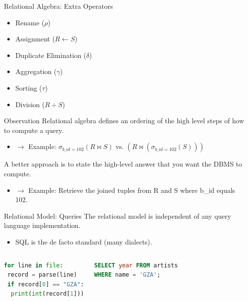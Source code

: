 \documentclass[aspectratio=169, 10pt]{beamer}
\begin{document}
\begin{frame}{Relational Algebra: Extra Operators}
    \begin{itemize}
        \item Rename ($\rho$)
        \item Assignment ($R \leftarrow S$)
        \item Duplicate Elimination ($\delta$)
        \item Aggregation ($\gamma$)
        \item Sorting ($\tau$)
        \item Division ($R \div S$)
    \end{itemize}
\end{frame}

\begin{frame}{Observation}
    Relational algebra defines an ordering of the high level steps of how to compute a query.
    \begin{itemize}
        \item $\rightarrow$ Example: $\sigma_{b\_id=102}(R \bowtie S)$ vs. $(R \bowtie (\sigma_{b\_id=102}(S)))$
    \end{itemize}
    \vspace{1em}
    A better approach is to state the high-level answer that you want the DBMS to compute.
    \begin{itemize}
        \item $\rightarrow$ Example: Retrieve the joined tuples from R and S where b\_id equals 102.
    \end{itemize}
\end{frame}

\begin{frame}[fragile]{Relational Model: Queries}
    The relational model is independent of any query language implementation.
    \begin{itemize}
        \item SQL is the de facto standard (many dialects).
    \end{itemize}
    \vspace{1em}
    \begin{columns}
        \begin{lstlisting}[language=Python]
for line in file:
 record = parse(line)
 if record[0] == "GZA":
  print(int(record[1]))
        \end{lstlisting}
        \begin{lstlisting}[language=SQL]
SELECT year FROM artists
WHERE name = 'GZA';
        \end{lstlisting}
    \end{columns}
\end{frame}
\end{document}
